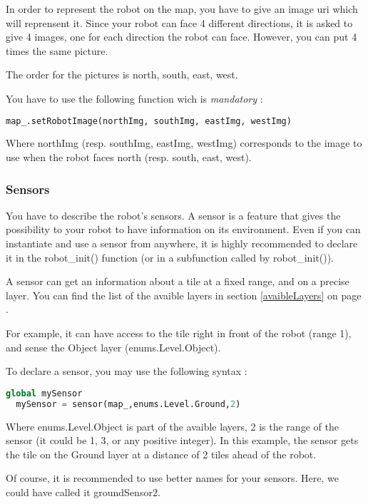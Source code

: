 \documentclass[a4paper,11pt]{article}
\begin{document}
In order to represent the robot on the map, you have to give an image
uri which will reprensent it. Since your robot can face 4 different
directions, it is asked to give 4 images, one for each direction the
robot can face. However, you can put 4 times the same picture.

The order for the pictures is north, south, east, west.

You have to use the following function wich is \emph{mandatory} :

\begin{lstlisting}[language=Python]
map_.setRobotImage(northImg, southImg, eastImg, westImg)
\end{lstlisting}

Where northImg (resp. southImg, eastImg, westImg) corresponds to the
image to use when the robot faces north (resp. south, east, west).

\subsubsection{Sensors}

You have to describe the robot's sensors. A sensor is a feature that
gives the possibility to your robot to have information on its
environment. Even if you can instantiate and use a sensor from
anywhere, it is highly recommended to declare it in the robot\_init()
function (or in a subfunction called by robot\_init()).

A sensor can get an information about a tile at a fixed range, and on
a precise layer. You can find the list of the avaible layers in
section \ref{avaibleLayers} on page \pageref{avaibleLayers}.

For example, it can have access to the tile right in front of the
robot (range 1), and sense the Object layer (enums.Level.Object).

To declare a sensor, you may use the following syntax :

\begin{lstlisting}[language=Python]
  global mySensor
  mySensor = sensor(map_,enums.Level.Ground,2)
\end{lstlisting}

Where enums.Level.Object is part of the avaible layers, 2 is the range
of the sensor (it could be 1, 3, or any positive integer). In this
example, the sensor gets the tile on the Ground layer at a distance of
2 tiles ahead of the robot.

Of course, it is recommended to use better names for your
sensors. Here, we could have called it groundSensor2.
\end{document}
